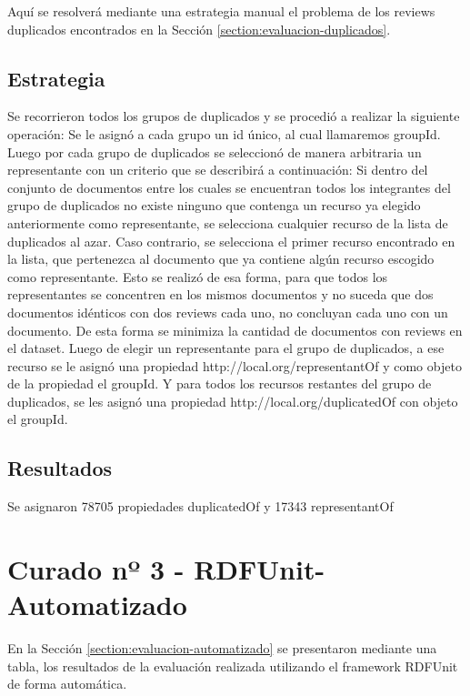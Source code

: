 \noindent Aquí se resolverá mediante una estrategia manual el problema de los reviews duplicados encontrados en la Sección \ref{section:evaluacion-duplicados}.

\subsection*{Estrategia}

Se recorrieron todos los grupos de duplicados y se procedió a realizar la siguiente operación:
Se le asignó a cada grupo un id único, al cual llamaremos groupId.
Luego por cada grupo de duplicados se seleccionó de manera arbitraria un representante con un criterio que se describirá a continuación:
Si dentro del conjunto de documentos entre los cuales se encuentran todos los integrantes del grupo de duplicados no existe ninguno 
que contenga un recurso ya elegido anteriormente como representante, se selecciona cualquier recurso de la lista de duplicados al azar.
Caso contrario, se selecciona el primer recurso encontrado en la lista, que pertenezca al documento que ya contiene algún recurso escogido 
como representante.
Esto se realizó de esa forma, para que todos los representantes se concentren en los mismos documentos y no suceda que dos 
documentos idénticos con dos reviews cada uno, no concluyan cada uno con un documento. De esta forma se minimiza la cantidad de 
documentos con reviews en el dataset.
Luego de elegir un representante para el grupo de duplicados, a ese recurso se le asignó una propiedad http://local.org/representantOf y 
como objeto de la propiedad el groupId.
Y para todos los recursos restantes del grupo de duplicados, se les asignó una propiedad http://local.org/duplicatedOf con objeto 
el groupId.

\subsection*{Resultados}

Se asignaron 78705 propiedades duplicatedOf y 17343 representantOf

\section{Curado nº 3 - RDFUnit-Automatizado}
\label{section:curado-automatizado}

\noindent En la Sección \ref{section:evaluacion-automatizado} se presentaron mediante una tabla, los resultados de la evaluación realizada
utilizando el framework RDFUnit de forma automática. 

